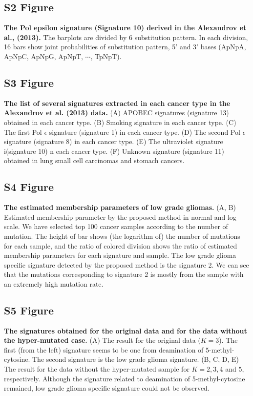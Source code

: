 \documentclass[10pt,letterpaper]{article}
\begin{document}
\subsection*{S2 Figure}
\label{nature2013_POLE}
{\bf The Pol epsilon signature (Signature 10) derived in the Alexandrov et al., (2013).}
The barplots are divided by 6 substitution pattern. 
In each division, 16 bars show joint probabilities of substitution pattern, 5' and 3' bases (ApNpA, ApNpC, ApNpG, ApNpT, $\cdots$, TpNpT).

\subsection*{S3 Figure}
\label{nature2013_sig_list}
{\bf The list of several signatures extracted in each cancer type in the Alexandrov et al. (2013) data.}
(A) APOBEC signatures (signature 13) obtained in each cancer type.
(B) Smoking signature in each cancer type.
(C) The first Pol $\epsilon$ signature (signature 1)  in each cancer type.
(D) The second Pol $\epsilon$ signature (signature 8) in each cancer type.
(E) The ultraviolet signature i(signature 10) n each cancer type.
(F) Unknown signature (signature 11) obtained in lung small cell carcinomas and stomach cancers.


\subsection*{S4 Figure}
\label{LGG_membership}
{\bf The estimated membership parameters of low grade gliomas.}
(A, B) Estimated membership parameter by the proposed method in normal and log scale.
We have selected top 100 cancer samples according to the number of mutation.
The height of bar shows (the logarithm of) the number of mutations for each sample,
and the ratio of colored division shows the ratio of estimated membership parameters for each signature and sample.
The low grade glioma specific signature detected by the proposed method is the signature 2.
We can see that the mutations corresponding to signature 2 is mostly from the sample with an extremely high mutation rate.


\subsection*{S5 Figure}
\label{LGG_signatures}
{\bf The signatures obtained for the original data and for the data without the hyper-mutated case.}
(A) The result for the original data ($K = 3$). The first (from the left) signature seems to be one from deamination of 5-methyl-cytosine. 
The second signature is the low grade glioma signature.
(B, C, D, E) The result for the data without the hyper-mutated sample for $K = 2, 3, 4$ and $5$, respectively.
Although the signature related to deamination of 5-methyl-cytosine remained, low grade glioma specific signature could not be observed.
\end{document}
